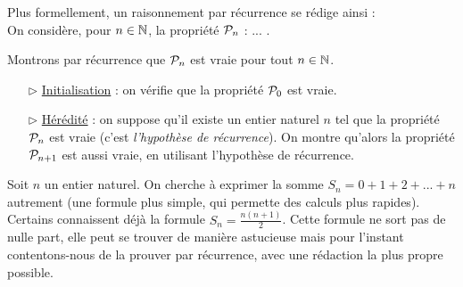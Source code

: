 Plus formellement, un raisonnement par r\'ecurrence se r\'edige ainsi :\\


On consid\`ere, pour $n\in\mathbb{N}$, la propri\'et\'e ${\cal P}_n$ : \og ... \fg.
 
Montrons par r\'ecurrence que ${\cal P}_n$ est vraie pour tout $n\in\mathbb{N}$.

\begin{itemize}

\item[$\triangleright$]
\underline{Initialisation} : 
on v\'erifie que la propri\'et\'e ${\cal P}_0$ est vraie.

\item[$\triangleright$]
\underline{H\'er\'edit\'e} : 
on suppose qu'il existe un entier naturel $n$ tel que la propri\'et\'e ${\cal P}_n$ est vraie (c'est \emph{l'hypoth\`ese de r\'ecurrence}). 
On montre qu'alors la propri\'et\'e ${\cal P}_{n+1}$ est aussi vraie, en utilisant l'hypoth\`ese de r\'ecurrence.

\end{itemize}



\bigskip

\begin{exo}
Soit $n$ un entier naturel. On cherche à exprimer la somme $S_n = 0+1+2+...+n$ autrement (une formule plus simple, qui permette des calculs plus rapides). Certains connaissent d\'ejà la formule $S_n = \frac{n(n+1)}{2}$. Cette formule ne sort pas de nulle part, elle peut se trouver de mani\`ere astucieuse mais pour l'instant contentons-nous de la prouver par r\'ecurrence, avec une r\'edaction la plus propre possible.
\end{exo}

